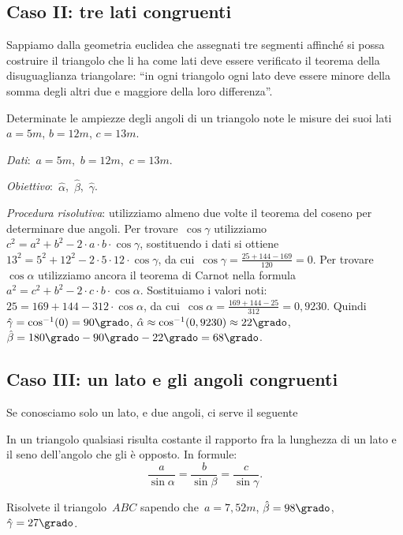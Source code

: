 \subsection{Caso II: tre lati congruenti}
Sappiamo dalla geometria euclidea che assegnati tre segmenti affinché si 
possa 
costruire il triangolo che li ha come lati
deve essere verificato il teorema della disuguaglianza triangolare: ``in ogni 
triangolo ogni lato deve essere minore della somma
degli altri due e maggiore della loro differenza''.

\begin{problema}
Determinate le ampiezze degli angoli di un triangolo note le misure dei suoi 
lati~\(a=5\unit{m}\), \(b=12\unit{m}\), \(c=13\unit{m}\).
\end{problema}

\emph{Dati}:~\(a= 5\unit{m}\),\quad~\(b=12\unit{m}\),\quad~\(c=13\unit{m}\).

\emph{Obiettivo}:~\(\hat{\alpha}\),\quad~\(\hat{\beta}\),\quad~\(\hat{\gamma}\).

\emph{Procedura risolutiva}:
utilizziamo almeno due volte il teorema del coseno per determinare due 
angoli. 
Per trovare~\(\cos \gamma\) utilizziamo
\(c^{2}=a^{2}+b^{2}-2\cdot a\cdot b\cdot \cos \gamma\), sostituendo i dati si 
ottiene~\(13^{2}=5^{2}+12^{2}-2\cdot 5\cdot 12\cdot \cos \gamma\),
da cui~\(\cos \gamma=\frac{25+144-169}{120}=0\).
Per trovare~\(\cos \alpha\) utilizziamo ancora il teorema di Carnot nella 
formula
\(a^{2}=c^{2}+b^{2}-2\cdot c\cdot b\cdot \cos \alpha\). Sostituiamo i valori 
noti:~\(25=169+144-312\cdot \cos \alpha\),
da cui~\(\cos \alpha=\frac{169+144-25}{312}=0,9230\).
Quindi~\(\hat{\gamma}=\cos^{-1}(0)=90\grado\), 
\(\hat{\alpha}\approx\cos^{-1}(0,9230)\approx22\grado\), 
\(\hat{\beta}=180\grado-90\grado-22\grado=68\grado\).

\subsection{Caso III: un lato e gli angoli congruenti}
Se conosciamo solo un lato, e due angoli, ci serve il seguente

\begin{teorema}
In un triangolo qualsiasi risulta costante il rapporto fra la lunghezza di un 
lato e il seno dell'angolo che gli è opposto. In formule:
\[\frac{a}{\sin \alpha}=\frac{b}{\sin \beta}=\frac{c}{\sin \gamma}.\]
\end{teorema}

\begin{problema}
Risolvete il triangolo~\(ABC\) sapendo che~\(a= 7,52\unit{m}\), 
\(\hat{\beta}=98\grado\), \({\hat{\gamma}}=27\grado\).
\end{problema}

